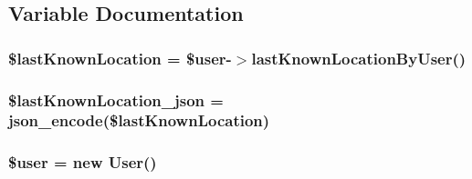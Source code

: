 \subsection{Variable Documentation}
\hypertarget{get_location_user_8php_aa5fe2c3d27419112c7d9ecfa23c5283d}{
\subsubsection[{\$last\-Known\-Location}]{\setlength{\rightskip}{0pt plus 5cm}\$last\-Known\-Location = \$user-\/$>$last\-Known\-Location\-By\-User()}}\label{get_location_user_8php_aa5fe2c3d27419112c7d9ecfa23c5283d}
\hypertarget{get_location_user_8php_a5fc838dd7506096f51e525a050c1672e}{
\subsubsection[{\$last\-Known\-Location\-\_\-json}]{\setlength{\rightskip}{0pt plus 5cm}\$last\-Known\-Location\-\_\-json = json\-\_\-encode(\$last\-Known\-Location)}}\label{get_location_user_8php_a5fc838dd7506096f51e525a050c1672e}
\hypertarget{get_location_user_8php_a598ca4e71b15a1313ec95f0df1027ca5}{
\subsubsection[{\$user}]{\setlength{\rightskip}{0pt plus 5cm}\$user = new {\bf User}()}}\label{get_location_user_8php_a598ca4e71b15a1313ec95f0df1027ca5}
